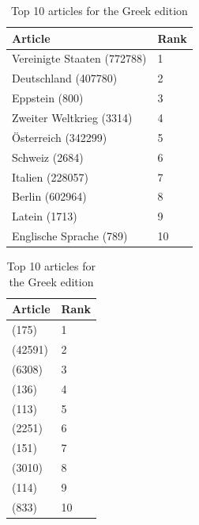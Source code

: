 \begin{table}[htbp]
    \begin{minipage}{.45\linewidth}
        \centering
        \begin{tabular}{ll}
            \toprule
            Article & Rank\\
            \midrule
            Vereinigte Staaten (772788) & 1\\
            Deutschland (407780) & 2\\
            Eppstein (800) & 3\\
            Zweiter Weltkrieg (3314) & 4\\
            Österreich (342299) & 5\\
            Schweiz (2684) & 6\\
            Italien (228057) & 7\\
            Berlin (602964) & 8\\
            Latein (1713) & 9\\
            Englische Sprache (789) & 10\\
            \bottomrule
        \end{tabular}
        \caption{Top 10 articles for the German edition}
    \end{minipage}
    \hfill
    \begin{minipage}{.45\linewidth}
        \centering
        \begin{tabular}{ll}
            \toprule
            Article & Rank\\
            \midrule
            (175) & 1\\
            (42591) & 2\\
            (6308) & 3\\
            (136) & 4\\
            (113) & 5\\
            (2251) & 6\\
            (151) & 7\\
            (3010) & 8\\
            (114) & 9\\
            (833) & 10\\
            \bottomrule
        \end{tabular}
        \caption{Top 10 articles for the Greek edition}
    \end{minipage}
\end{table}
